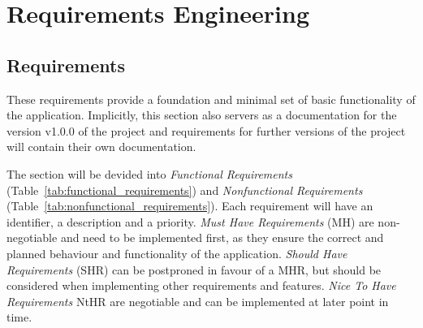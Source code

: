 \section{Requirements Engineering}\label{sec:requirements_engineering}
\subsection{Requirements}\label{sec:requirements}
These requirements provide a foundation and minimal set of basic functionality of the application. Implicitly, this section also
servers as a documentation for the version v1.0.0 of the project and requirements for further versions of the project will contain
their own documentation. 

The section will be devided into \emph{Functional Requirements} (Table~\ref{tab:functional_requirements}) and \emph{Nonfunctional
Requirements} (Table~\ref{tab:nonfunctional_requirements}). Each requirement will have an identifier, a description and a
priority. \emph{Must Have Requirements} (MH) are non-negotiable and need to be implemented first, as they ensure the correct and
planned behaviour and functionality of the application. \emph{Should Have Requirements} (SHR) can be postproned in favour of a
MHR, but should be considered when implementing other requirements and features.  \emph{Nice To Have Requirements} NtHR are
negotiable and can be implemented at later point in time.  

